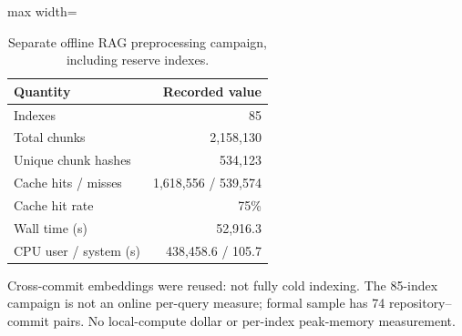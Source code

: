 \begin{table}[t]
\centering
\caption{Separate offline RAG preprocessing campaign, including reserve indexes.}\label{tab:offline}
\small
\begin{adjustbox}{max width=\columnwidth}\begin{tabular}{lr}
\toprule
Quantity & Recorded value \\
\midrule
Indexes & 85 \\
Total chunks & 2,158,130 \\
Unique chunk hashes & 534,123 \\
Cache hits / misses & 1,618,556 / 539,574 \\
Cache hit rate & 75\% \\
Wall time (s) & 52,916.3 \\
CPU user / system (s) & 438,458.6 / 105.7 \\
\bottomrule
\end{tabular}\end{adjustbox}
\par\vspace{2pt}\begin{minipage}{\columnwidth}\footnotesize Cross-commit embeddings were reused: not fully cold indexing. The 85-index campaign is not an online per-query measure; formal sample has 74 repository--commit pairs. No local-compute dollar or per-index peak-memory measurement.\end{minipage}
\end{table}

